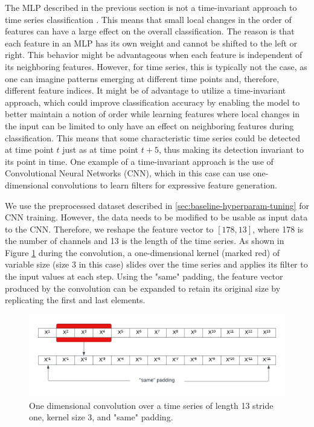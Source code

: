 \documentclass[runningheads]{llncs}
\begin{document}
The MLP described in the previous section is not a time-invariant approach to time series classification \cite{DBLP:journals/corr/abs-1809-04356}. This means that small local changes in the order of features can have a large effect on the overall classification. The reason is that each feature in an MLP has its own weight and cannot be shifted to the left or right. 
This behavior might be advantageous when each feature is independent of its neighboring features. However, for time series, this is typically not the case, as one can imagine patterns emerging at different time points and, therefore, different feature indices.
It might be of advantage to utilize a time-invariant approach, which could improve classification accuracy by enabling the model to better maintain a notion of order while learning features where local changes in the input can be limited to only have an effect on neighboring features during classification. This means that some characteristic time series could be detected at time point $t$ just as at time point $t+5$, thus making its detection invariant to its point in time.
One example of a time-invariant approach is the use of Convolutional Neural Networks (CNN), which in this case can use one-dimensional convolutions to learn filters for expressive feature generation.

We use the preprocessed dataset described in \ref{sec:baseline-hyperparam-tuning} for CNN training. However, the data needs to be modified to be usable as input data to the CNN. Therefore, we reshape the feature vector to $[178, 13]$, where 178 is the number of channels and 13 is the length of the time series. 
As shown in Figure \ref{fig:cnn_kernel} during the convolution, a one-dimensional kernel (marked red) of variable size (size 3 in this case) slides over the time series and applies its filter to the input values at each step. Using the "same" padding, the feature vector produced by the convolution can be expanded to retain its original size by replicating the first and last elements.

\begin{figure}[h]
    \includegraphics[width=\textwidth]{images/cnn_kernel.pdf}
    \caption{ One dimensional convolution over a time series of length 13 stride one, kernel size 3, and "same" padding.}
    \label{fig:cnn_kernel}
\end{figure}
\end{document}
